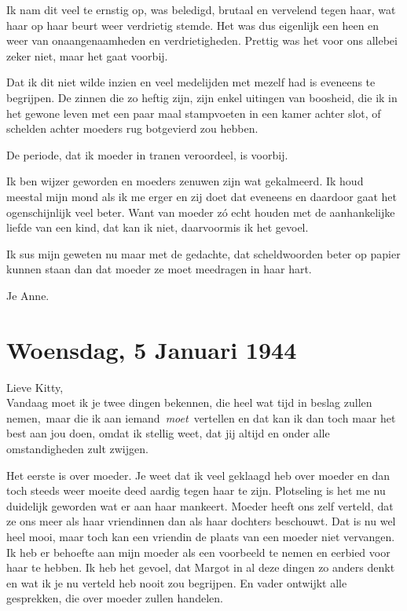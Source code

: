 \documentclass{book}
\begin{document}
Ik nam dit veel te ernstig op, was beledigd, brutaal en vervelend tegen
haar, wat haar op haar beurt weer verdrietig stemde. Het was dus
eigenlijk een heen en weer van onaangenaamheden en verdrietigheden.
Prettig was het voor ons allebei zeker niet, maar het gaat voorbij.

Dat ik dit niet wilde inzien en veel medelijden met mezelf had is
eveneens te begrijpen. De zinnen die zo heftig zijn, zijn enkel uitingen
van boosheid, die ik in het gewone leven met een paar maal stampvoeten
in een kamer achter slot, of schelden achter moeders rug botgevierd zou
hebben.

De periode, dat ik moeder in tranen veroordeel, is voorbij.

Ik ben wijzer geworden en moeders zenuwen zijn wat gekalmeerd. Ik houd
meestal mijn mond als ik me erger en zij doet dat eveneens en daardoor
gaat het ogenschijnlijk veel beter. Want van moeder zó echt houden met
de aanhankelijke liefde van een kind, dat kan ik niet, daarvoormis ik
het gevoel.

Ik sus mijn geweten nu maar met de gedachte, dat scheldwoorden beter op
papier kunnen staan dan dat moeder ze moet meedragen in haar hart.

Je Anne.

\chapter{Woensdag, 5 Januari 1944}

Lieve Kitty,\\Vandaag moet ik je twee dingen bekennen, die heel wat tijd
in beslag zullen nemen,~maar die ik aan iemand~\emph{moet}~vertellen en
dat kan ik dan toch maar het best aan jou doen, omdat ik stellig weet,
dat jij altijd en onder alle omstandigheden zult zwijgen.

Het eerste is over moeder. Je weet dat ik veel geklaagd heb over moeder
en dan toch steeds weer moeite deed aardig tegen haar te zijn.
Plotseling is het me nu duidelijk geworden wat er aan haar mankeert.
Moeder heeft ons zelf verteld, dat ze ons meer als haar vriendinnen dan
als haar dochters beschouwt. Dat is nu wel heel mooi, maar toch kan een
vriendin de plaats van een moeder niet vervangen. Ik heb er behoefte aan
mijn moeder als een voorbeeld te nemen en eerbied voor haar te hebben.
Ik heb het gevoel, dat Margot in al deze dingen zo anders denkt en wat
ik je nu verteld heb nooit zou begrijpen. En vader ontwijkt alle
gesprekken, die over moeder zullen handelen.
\end{document}
